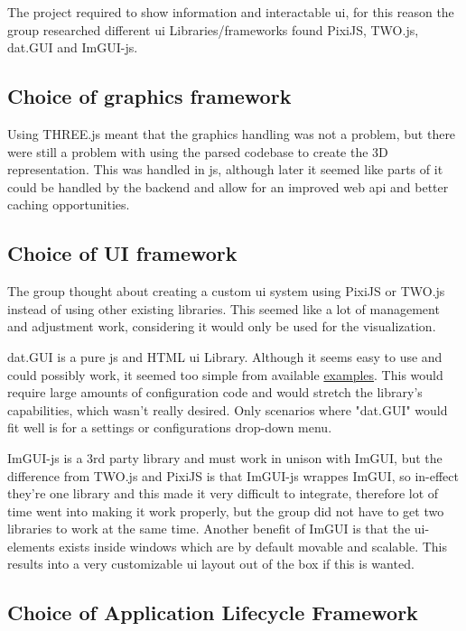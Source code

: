 The project required to show information and interactable \gls{ui}, for this reason the group researched different \gls{ui} Libraries/frameworks found PixiJS, TWO.js, dat.GUI and ImGUI-js.

\subsection{Choice of graphics framework}
Using THREE.js meant that the graphics handling was not a problem, but there were still a problem with using the parsed codebase to create the 3D representation. This was handled in \Gls{js}, although later it seemed like parts of it could be handled by the \gls{backend} and allow for an improved web \gls{api} and better caching opportunities. 

\subsection{Choice of UI framework}
The group thought about creating a custom \gls{ui} system using PixiJS or TWO.js instead of using other existing libraries. This seemed like a lot of management and adjustment work, considering it would only be used for the visualization. 

dat.GUI is a pure \Gls{js} and HTML \gls{ui} Library. Although it seems easy to use and could possibly work, it seemed too simple from available \href{https://workshop.chromeexperiments.com/examples/gui/#1--Basic-Usage}{examples}. This would require large amounts of configuration code and would stretch the library's capabilities, which wasn't really desired. Only scenarios where "dat.GUI" would fit well is for a settings or configurations drop-down menu.

ImGUI-js is a 3rd party library and must work in unison with ImGUI, but the difference from TWO.js and PixiJS is that ImGUI-js wrappes ImGUI, so in-effect they're one library and this made it very difficult to integrate, therefore lot of time went into making it work properly, but the group did not have to get two libraries to work at the same time. Another benefit of ImGUI is that the \gls{ui}-elements exists inside windows which are by default movable and scalable. This results into a very customizable \gls{ui} layout out of the box if this is wanted.

\subsection{Choice of Application Lifecycle Framework}

